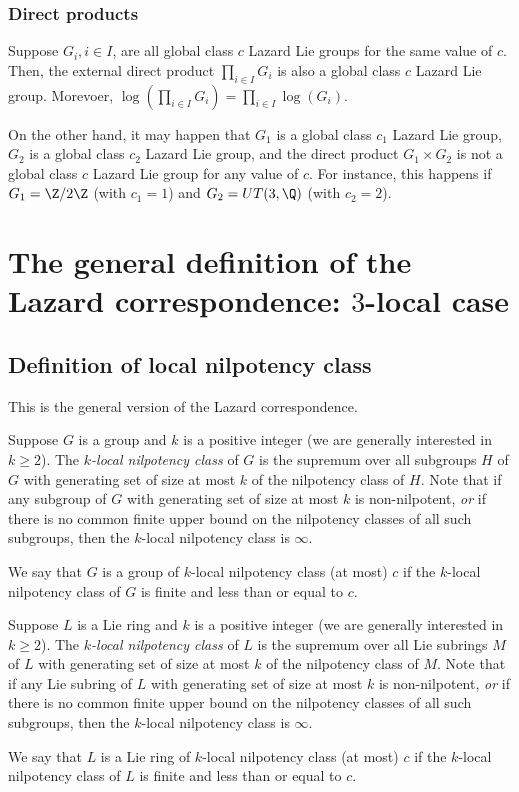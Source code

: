 \documentclass{ucetd}
\begin{document}
\subsubsection{Direct products}

Suppose $G_i, i \in I$, are all global class $c$ Lazard Lie groups for
the same value of $c$. Then, the external direct product $\prod_{i \in
  I} G_i$ is also a global class $c$ Lazard Lie group. Morevoer,
$\log(\prod_{i \in I} G_i) = \prod_{i \in I} \log(G_i)$.

On the other hand, it may happen that $G_1$ is a global class $c_1$
Lazard Lie group, $G_2$ is a global class $c_2$ Lazard Lie group, and
the direct product $G_1 \times G_2$ is not a global class $c$ Lazard
Lie group for any value of $c$. For instance, this happens if $G_1 =
\Z/2\Z$ (with $c_1 = 1$) and $G_2 = UT(3,\Q)$ (with $c_2 = 2$).

\section{The general definition of the Lazard correspondence: $3$-local case}\label{sec:lazard-correspondence}

\subsection{Definition of local nilpotency class}

This is the general version of the Lazard correspondence.

\begin{definer}
  Suppose $G$ is a group and $k$ is a positive integer (we are
  generally interested in $k \ge 2$). The {\em $k$-local nilpotency
    class} of $G$ is the supremum over all subgroups $H$ of $G$ with
  generating set of size at most $k$ of the nilpotency class of
  $H$. Note that if any subgroup of $G$ with generating set of size at
  most $k$ is non-nilpotent, {\em or} if there is no common finite
  upper bound on the nilpotency classes of all such subgroups, then
  the $k$-local nilpotency class is $\infty$.

  We say that $G$ is a group of $k$-local nilpotency class (at most)
  $c$ if the $k$-local nilpotency class of $G$ is finite and less than
  or equal to $c$.
\end{definer}

\begin{definer}
  Suppose $L$ is a Lie ring and $k$ is a positive integer (we are
  generally interested in $k \ge 2$). The {\em $k$-local nilpotency
    class} of $L$ is the supremum over all Lie subrings $M$ of $L$ with
  generating set of size at most $k$ of the nilpotency class of
  $M$. Note that if any Lie subring of $L$ with generating set of size at
  most $k$ is non-nilpotent, {\em or} if there is no common finite
  upper bound on the nilpotency classes of all such subgroups, then
  the $k$-local nilpotency class is $\infty$.

  We say that $L$ is a Lie ring of $k$-local nilpotency class (at most)
  $c$ if the $k$-local nilpotency class of $L$ is finite and less than
  or equal to $c$.
\end{definer}
\end{document}
